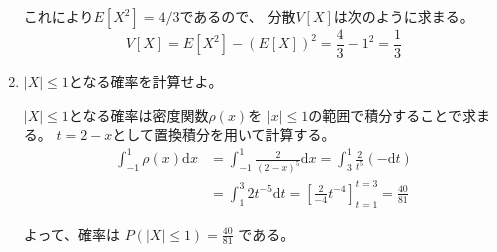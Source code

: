 \documentclass[12pt,b5paper]{ltjsarticle}
\begin{document}
\begin{enumerate}
      これにより$E[X^{2}]=4/3$であるので、
      分散$V[X]$は次のように求まる。
      \begin{equation}
       V[X] = E[X^{2}]-(E[X])^{2} = \frac{4}{3} -1^{2} = \frac{1}{3}
      \end{equation}


 \item
      $\lvert X \rvert \leq 1$となる確率を計算せよ。

      \dotfill

      $\lvert X \rvert \leq 1$となる確率は密度関数$\rho(x)$を
      $\lvert x \rvert \leq1$の範囲で積分することで求まる。
      $t=2-x$として置換積分を用いて計算する。
      \begin{align}
       \int_{-1}^{1} \rho(x) \mathrm{d}x
        &= \int_{-1}^{1} \frac{2}{(2-x)^{5}} \mathrm{d}x
        = \int_{3}^{1} \frac{2}{t^{5}} (-\mathrm{d}t)\\
        &= \int_{1}^{3} 2t^{-5} \mathrm{d}t
        = \left[ \frac{2}{-4}t^{-4} \right]_{t=1}^{t=3}
        = \frac{40}{81}%
      \end{align}

      よって、確率は
      $P(\lvert X \rvert \leq 1) = \frac{40}{81}$
      である。
      
\end{enumerate}



\hrulefill
\end{document}
